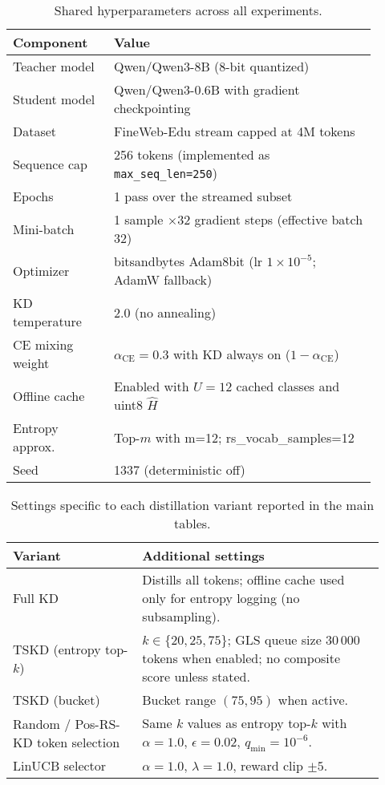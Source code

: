 \documentclass[11pt]{article}
\begin{document}
\begin{table}[h]
	\centering
	\small
	\setlength{\tabcolsep}{8pt}
\begin{tabular}{p{0.25\linewidth}p{0.65\linewidth}}
Component & Value \\
\midrule
Teacher model & Qwen/Qwen3-8B (8-bit quantized) \\
Student model & Qwen/Qwen3-0.6B with gradient checkpointing \\
Dataset & FineWeb-Edu stream capped at 4M tokens \\
Sequence cap & 256 tokens (implemented as \texttt{max\_seq\_len=250}) \\
Epochs & 1 pass over the streamed subset \\
Mini-batch & 1 sample \(\times 32\) gradient steps (effective batch 32) \\
Optimizer & bitsandbytes Adam8bit (lr $1\times 10^{-5}$; AdamW fallback) \\
KD temperature & 2.0 (no annealing) \\
CE mixing weight & $\alpha_{\text{CE}}=0.3$ with KD always on ($1-\alpha_{\text{CE}}$) \\
Offline cache & Enabled with $U=12$ cached classes and uint8 $\hat H$ \\
Entropy approx. & Top-$m$ with m=12; rs\_vocab\_samples=12 \\
Seed & 1337 (deterministic off) \\
\bottomrule
\end{tabular}
\caption{Shared hyperparameters across all experiments.}
\label{tab:shared-hparams}
\end{table}

\begin{table}[h]
	\centering
	\small
	\setlength{\tabcolsep}{8pt}
\begin{tabular}{p{0.32\linewidth}p{0.6\linewidth}}
Variant & Additional settings \\
\midrule
Full KD & Distills all tokens; offline cache used only for entropy logging (no subsampling). \\
TSKD (entropy top-$k$) & $k\in\{20,25,75\}$; GLS queue size $30\,000$ tokens when enabled; no composite score unless stated. \\
TSKD (bucket) & Bucket range $(75,95)$ when active. \\
Random / Pos-RS-KD token selection & Same $k$ values as entropy top-$k$ with $\alpha=1.0$, $\epsilon=0.02$, $q_{\min}=10^{-6}$. \\
LinUCB selector & $\alpha=1.0$, $\lambda=1.0$, reward clip $\pm 5$. \\
\bottomrule
\end{tabular}
\caption{Settings specific to each distillation variant reported in the main tables.}
\label{tab:variant-hparams}
\end{table}
\end{document}
